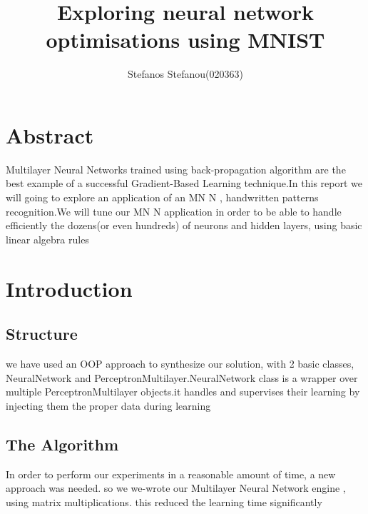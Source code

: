 \documentclass{proc}
\title{Exploring neural network optimisations using MNIST}
\author{Stefanos Stefanou(020363)}
\begin{document}
	\maketitle
	\section{Abstract}
	Multilayer Neural Networks trained using back-propagation algorithm are the best example of a successful
	Gradient-Based Learning technique.In this report we will going to explore an application of an MN N , handwritten 
	patterns recognition.We will tune our MN N application in order to be able to handle efficiently the dozens(or even hundreds) of neurons and hidden layers, using basic linear algebra rules
	\section{Introduction}

	\subsection{Structure}
	we have used an OOP approach to synthesize our solution, with 2 basic classes, NeuralNetwork and PerceptronMultilayer.NeuralNetwork class is a wrapper over multiple PerceptronMultilayer objects.it handles and supervises their learning by injecting them the proper data during learning
	\subsection{The Algorithm}
	In order to perform our experiments in a reasonable amount of time, a new approach was needed. so we we-wrote our Multilayer Neural Network engine , using matrix multiplications. this reduced the learning time significantly
\end{document}
